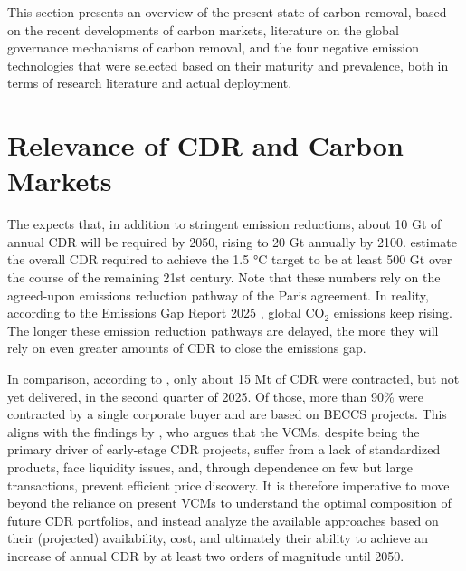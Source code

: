 This section presents an overview of the present state of carbon removal, based on the recent developments of  carbon markets, literature on the global governance mechanisms of carbon removal, and the four negative emission technologies that were selected based on their maturity and prevalence, both in terms of research literature and actual deployment.

\section{Relevance of CDR and Carbon Markets}
The \textcite{unep_emissions_2017} expects that, in addition to stringent emission reductions, about 10 Gt of annual CDR will be required by 2050, rising to 20 Gt annually by 2100. \textcite{breyer_proposing_2023} estimate the overall CDR required to achieve the 1.5 °C target to be at least 500 Gt over the course of the remaining 21st century. Note that these numbers rely on the agreed-upon emissions reduction pathway of the Paris agreement. In reality, according to the Emissions Gap Report 2025 \parencite{unep_emissions_2025}, global CO$_2$ emissions keep rising. The longer these emission reduction pathways are delayed, the more they will rely on even greater amounts of CDR to close the emissions gap.\vspace{2mm}

In comparison, according to \textcite{cdrfyi_2025_2025}, only about 15 Mt of CDR were contracted, but not yet delivered, in the second quarter of 2025. Of those, more than 90\% were contracted by a single corporate buyer and are based on BECCS projects. This aligns with the findings by \textcite{roston_market_2025}, who argues that the VCMs, despite being the primary driver of early-stage CDR projects, suffer from a lack of standardized products, face liquidity issues, and, through dependence on few but large transactions, prevent efficient price discovery. It is therefore imperative to move beyond the reliance on present VCMs to understand the optimal composition of future CDR portfolios, and instead analyze the available approaches based on their (projected) availability, cost, and ultimately their ability to achieve an increase of annual CDR by at least two orders of magnitude until 2050.

